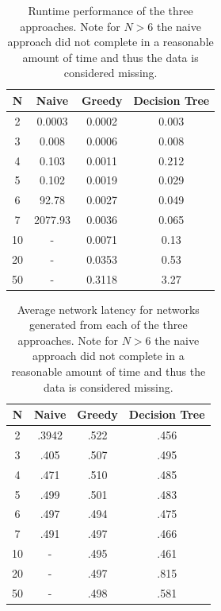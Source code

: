 \begin{table}
  \caption{Runtime performance of the three approaches. Note for $N > 6$ the naive approach did not complete in a reasonable amount of time and thus the data is considered missing.}

  \centering
  \begin{tabular}{| c || c | c | c |}
    \hline 
    N & Naive & Greedy &  Decision Tree  \\
    \hline
    2 &  0.0003           &  0.0002      &  0.003  \\
    \hline
    3 &  0.008           &  0.0006      &   0.008\\
    \hline
    4 &  0.103          &  0.0011      &   0.212\\
    \hline
    5 &  0.102         &  0.0019      &   0.029\\
    \hline
    6 &  92.78       &  0.0027       &   0.049\\
    \hline
    7 &  2077.93              &  0.0036       &  0.065 \\
    \hline
    10 &  -             &  0.0071      &   0.13\\
    \hline
    20 &   -            &  0.0353      &   0.53 \\
    \hline
    50 &   -            &  0.3118      &   3.27\\
    \hline

  \end{tabular}
  \label{tab:performance-runtime}
\end{table}

\begin{table}
  \caption{Average network latency for networks generated from each of the three approaches. Note for $N > 6$ the naive approach did not complete in a reasonable amount of time and thus the data is considered missing.}

  \centering
  \begin{tabular}{| c || c | c | c |}
    \hline 
    N & Naive & Greedy & Decision Tree  \\
    \hline
    2 &  .3942     &   .522     &  .456 \\
    \hline
    3 &  .405       &   .507     & .495  \\
    \hline
    4 &  .471       &   .510     & .485  \\
    \hline
    5 &  .499       &   .501     & .483  \\
    \hline
    6 &  .497      &   .494     &  .475 \\
    \hline
    7 &  .491           &   .497     & .466  \\
    \hline
    10 &  -          &   .495     &  .461 \\
    \hline
    20 &   -         &   .497     &  .815 \\
    \hline
    50 &   -         &   .498     &  .581 \\
    \hline

  \end{tabular}
  \label{tab:performance-latency}
\end{table}


